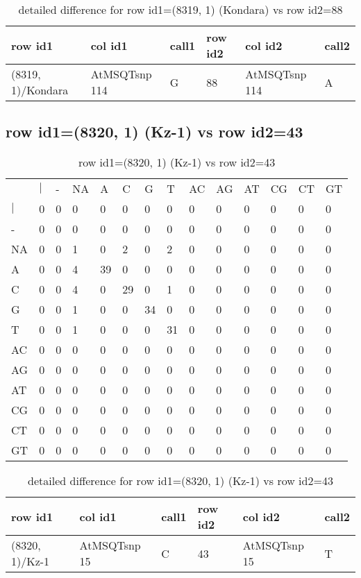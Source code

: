 \begin{center}
\begin{longtable}{|l|l|l|l|l|l|}
\caption{detailed difference for row id1=(8319, 1) (Kondara) vs row id2=88} \label{table_dm311}\\
\hline
row id1&col id1&call1&row id2&col id2&call2\\
\hline
(8319, 1)/Kondara&AtMSQTsnp 114&G&88&AtMSQTsnp 114&A\\
\hline
\end{longtable}
\end{center}

\subsection{row id1=(8320, 1) (Kz-1) vs row id2=43}
\begin{center}
\begin{longtable}{|l|l|l|l|l|l|l|l|l|l|l|l|l|l|}
\caption{row id1=(8320, 1) (Kz-1) vs row id2=43} \label{table_dm312}\\
\hline
\\
\hline
&$|$&-&NA&A&C&G&T&AC&AG&AT&CG&CT&GT\\
$|$&0&0&0&0&0&0&0&0&0&0&0&0&0\\
-&0&0&0&0&0&0&0&0&0&0&0&0&0\\
NA&0&0&1&0&2&0&2&0&0&0&0&0&0\\
A&0&0&4&39&0&0&0&0&0&0&0&0&0\\
C&0&0&4&0&29&0&1&0&0&0&0&0&0\\
G&0&0&1&0&0&34&0&0&0&0&0&0&0\\
T&0&0&1&0&0&0&31&0&0&0&0&0&0\\
AC&0&0&0&0&0&0&0&0&0&0&0&0&0\\
AG&0&0&0&0&0&0&0&0&0&0&0&0&0\\
AT&0&0&0&0&0&0&0&0&0&0&0&0&0\\
CG&0&0&0&0&0&0&0&0&0&0&0&0&0\\
CT&0&0&0&0&0&0&0&0&0&0&0&0&0\\
GT&0&0&0&0&0&0&0&0&0&0&0&0&0\\
\hline
\end{longtable}
\end{center}

\begin{center}
\begin{longtable}{|l|l|l|l|l|l|}
\caption{detailed difference for row id1=(8320, 1) (Kz-1) vs row id2=43} \label{table_dm313}\\
\hline
row id1&col id1&call1&row id2&col id2&call2\\
\hline
(8320, 1)/Kz-1&AtMSQTsnp 15&C&43&AtMSQTsnp 15&T\\
\hline
\end{longtable}
\end{center}

